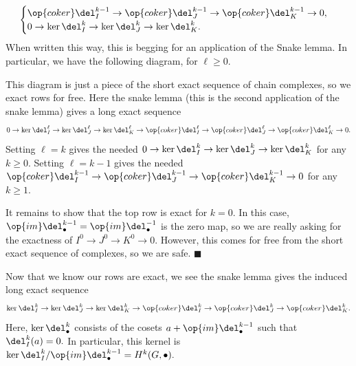 \[\begin{cases}
    \op{coker}\del_I^{k-1}\to\op{coker}\del_J^{k-1}\to\op{coker}\del_K^{k-1}\to0, \\
    0\to\ker\del_I^k\to\ker\del_J^k\to\ker\del_K^k.
\end{cases}\]
When written this way, this is begging for an application of the Snake lemma. In particular, we have the following diagram, for $\ell\ge0.$
\begin{center}
\end{center}
This diagram is just a piece of the short exact sequence of chain complexes, so we exact rows for free. Here the snake lemma (this is the second application of the snake lemma) gives a long exact sequence
\[0\to\ker\del_I^\ell\to\ker\del_J^\ell\to\ker\del_K^\ell\to\op{coker}\del_I^\ell\to\op{coker}\del_J^\ell\to\op{coker}\del_K^\ell\to0.\]
Setting $\ell=k$ gives the needed $0\to\ker\del_I^k\to\ker\del_J^k\to\ker\del_K^k$ for any $k\ge0.$ Setting $\ell=k-1$ gives the needed $\op{coker}\del_I^{k-1}\to\op{coker}\del_J^{k-1}\to\op{coker}\del_K^{k-1}\to0$ for any $k\ge1.$

It remains to show that the top row is exact for $k=0.$ In this case, $\op{im}\del_\bullet^{k-1}=\op{im}\del_\bullet^{-1}$ is the zero map, so we are really asking for the exactness of $I^0\to J^0\to K^0\to0.$ However, this comes for free from the short exact sequence of complexes, so we are safe. $\blacksquare$

Now that we know our rows are exact, we see the snake lemma gives the induced long exact sequence
\[\ker\del_I^k\to\ker\del_J^k\to\ker\del_K^k\to\op{coker}\del_I^k\to\op{coker}\del_J^k\to\op{coker}\del_K^k.\]
Here, $\ker\del_\bullet^k$ consists of the cosets $a+\op{im}\del_\bullet^{k-1}$ such that $\del_I^k(a)=0.$ In particular, this kernel is $\ker\del_I^k/\op{im}\del_\bullet^{k-1}=H^k(G,\bullet).$

